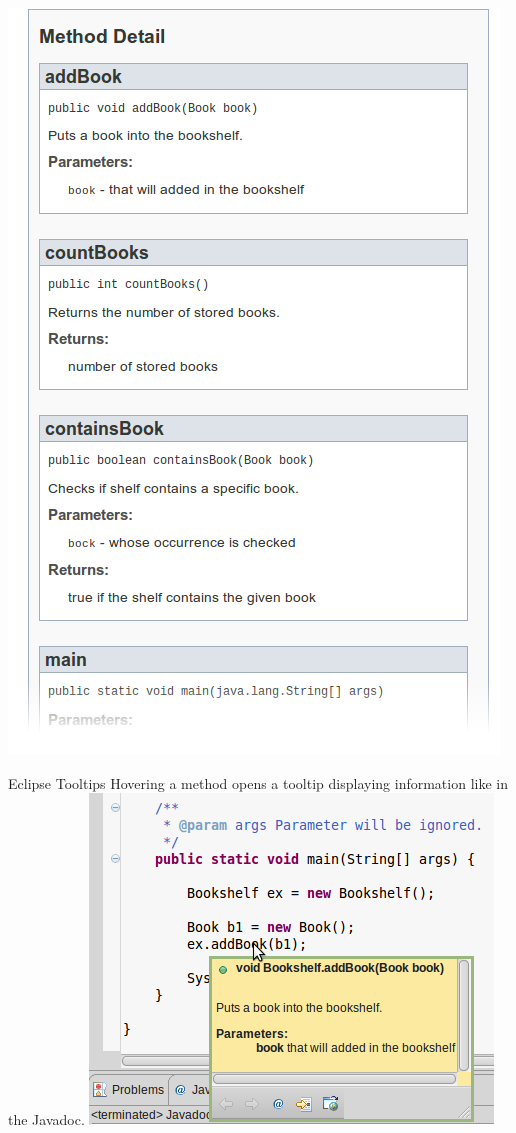 \begin{frame}
	\includegraphics[scale=0.25]{res/javadoc_shelf_right.png}
\end{frame}

\begin{frame}{Eclipse Tooltips}
	Hovering a method opens a tooltip displaying information like in the Javadoc.
	\vfill
	\includegraphics[scale=0.35]{res/javadoc_eclipse.png}
\end{frame}

